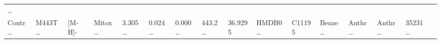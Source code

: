 \documentclass[
]{article}
\begin{document}
\begin{longtable}[]{@{}llllllllllllllll@{}}
\begin{minipage}[t]{0.02\columnwidth}
\ldots{}\strut
\end{minipage}\tabularnewline
\begin{minipage}[t]{0.04\columnwidth}\raggedright
Contr\ldots{}\strut
\end{minipage} & \begin{minipage}[t]{0.04\columnwidth}\raggedright
M443T\ldots{}\strut
\end{minipage} & \begin{minipage}[t]{0.04\columnwidth}\raggedright
{[}M-H{]}-\strut
\end{minipage} & \begin{minipage}[t]{0.04\columnwidth}\raggedright
Mitox\ldots{}\strut
\end{minipage} & \begin{minipage}[t]{0.04\columnwidth}\raggedright
3.305\ldots{}\strut
\end{minipage} & \begin{minipage}[t]{0.04\columnwidth}\raggedright
0.024\ldots{}\strut
\end{minipage} & \begin{minipage}[t]{0.04\columnwidth}\raggedright
0.000\ldots{}\strut
\end{minipage} & \begin{minipage}[t]{0.04\columnwidth}\raggedright
443.2\ldots{}\strut
\end{minipage} & \begin{minipage}[t]{0.04\columnwidth}\raggedright
36.9295\strut
\end{minipage} & \begin{minipage}[t]{0.04\columnwidth}\raggedright
HMDB0\ldots{}\strut
\end{minipage} & \begin{minipage}[t]{0.03\columnwidth}\raggedright
C11195\strut
\end{minipage} & \begin{minipage}[t]{0.04\columnwidth}\raggedright
Benze\ldots{}\strut
\end{minipage} & \begin{minipage}[t]{0.04\columnwidth}\raggedright
Anthr\ldots{}\strut
\end{minipage} & \begin{minipage}[t]{0.04\columnwidth}\raggedright
Anthr\ldots{}\strut
\end{minipage} & \begin{minipage}[t]{0.04\columnwidth}\raggedright
35231\ldots{}\strut
\end{minipage} & \begin{minipage}[t]{0.02\columnwidth}\raggedright

\end{minipage}
\end{longtable}
\end{document}
